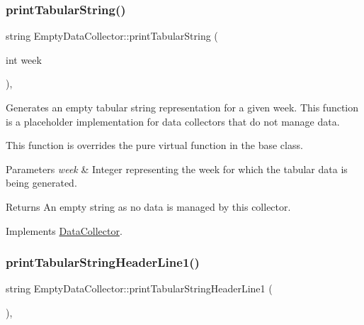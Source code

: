 \mbox{\label{classEmptyDataCollector_a2bb44e454376ed518c4d89cf324b8bd7}} 
\subsubsection{\texorpdfstring{print\+Tabular\+String()}{printTabularString()}}
{\footnotesize\ttfamily string Empty\+Data\+Collector\+::print\+Tabular\+String (\begin{DoxyParamCaption}\item[{int}]{week }\end{DoxyParamCaption})\hspace{0.3cm}{\ttfamily [override]}, {\ttfamily [virtual]}}



Generates an empty tabular string representation for a given week. This function is a placeholder implementation for data collectors that do not manage data. 

This function is overrides the pure virtual function in the base class.


\begin{DoxyParams}{Parameters}
{\em week} & Integer representing the week for which the tabular data is being generated.\\
\hline
\end{DoxyParams}
\begin{DoxyReturn}{Returns}
An empty string as no data is managed by this collector. 
\end{DoxyReturn}


Implements \mbox{\hyperlink{classDataCollector_a397fccabe0223267eea8fc7cac0e59da}{Data\+Collector}}.

\mbox{\label{classEmptyDataCollector_afa47b48abb2ed59c16f1253e55f93cf2}} 
\subsubsection{\texorpdfstring{print\+Tabular\+String\+Header\+Line1()}{printTabularStringHeaderLine1()}}
{\footnotesize\ttfamily string Empty\+Data\+Collector\+::print\+Tabular\+String\+Header\+Line1 (\begin{DoxyParamCaption}{ }\end{DoxyParamCaption})\hspace{0.3cm}{\ttfamily [override]}, {\ttfamily [virtual]}}



